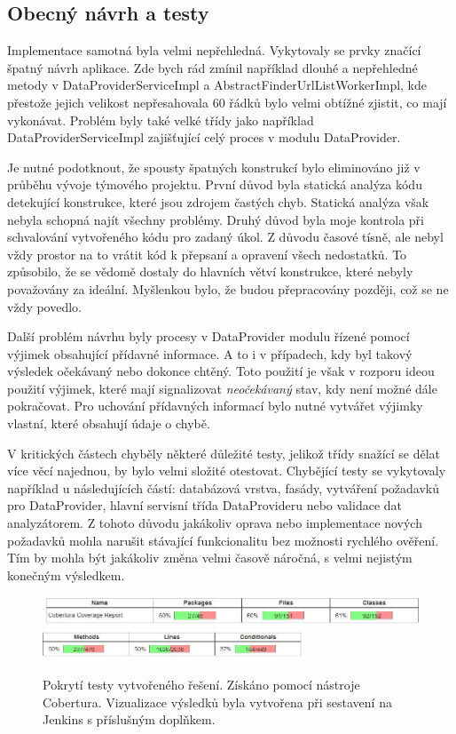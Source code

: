 \documentclass[thesis=B,czech]{FITthesis}[2012/06/26]
\begin{document}
\subsection{Obecný návrh a testy}\label{ch:architecture-tests}
Implementace samotná byla velmi nepřehledná. Vykytovaly se prvky značící špatný návrh aplikace.
Zde bych rád zmínil například dlouhé a nepřehledné metody v
DataProviderServiceImpl a AbstractFinderUrlListWorkerImpl, kde přestože jejich velikost 
nepřesahovala 60 řádků bylo velmi obtížné zjistit, co mají vykonávat. Problém byly také velké třídy
jako například DataProviderServiceImpl zajišťující celý proces v modulu DataProvider.
\par
Je nutné podotknout, že spousty špatných konstrukcí bylo eliminováno již v průběhu vývoje týmového projektu.
První důvod byla statická analýza kódu detekující konstrukce, které jsou zdrojem častých chyb. Statická analýza
však nebyla schopná najít všechny problémy. Druhý důvod byla moje kontrola při schvalování vytvořeného kódu pro 
zadaný úkol. Z důvodu časové tísně, ale nebyl vždy prostor na to vrátit kód k přepsaní a opravení všech nedostatků. To způsobilo, že
se vědomě dostaly do hlavních větví konstrukce, které nebyly považovány za ideální. Myšlenkou bylo, že budou přepracovány později, což se ne vždy povedlo.
\par
Další problém návrhu byly procesy v DataProvider modulu řízené pomocí výjimek obsahující 
přídavné informace. A to i v případech, kdy byl takový výsledek očekávaný nebo dokonce chtěný. 
Toto použití je však v rozporu ideou použití výjimek, které mají signalizovat \textit{neočekávaný} stav, kdy není možné dále pokračovat.\cite{exception}
Pro uchování přídavných informací bylo nutné vytvářet výjimky vlastní, které obsahují údaje o chybě.
\par
V kritických částech chyběly některé důležité testy, jelikož třídy snažící se dělat více věcí najednou, by bylo velmi
složité otestovat. Chybějící testy se vykytovaly například u následujících částí: databázová vrstva, fasády, vytváření požadavků pro DataProvider,
hlavní servisní třída DataProvideru nebo validace dat analyzátorem. Z tohoto důvodu jakákoliv oprava nebo implementace nových požadavků 
mohla narušit stávající funkcionalitu bez možnosti rychlého ověření. Tím by mohla být jakákoliv změna velmi časově náročná, s velmi nejistým konečným výsledkem.

\begin{figure}[h]\centering
 	\includegraphics[width=1.0\textwidth]{resources/cobertura-report-old-1}
 	\includegraphics[width=0.7\textwidth]{resources/cobertura-report-old-2}
	\caption[Pokrytí testy vytvořeného řešení]{Pokrytí testy vytvořeného řešení. Získáno pomocí nástroje Cobertura. Vizualizace
	výsledků byla vytvořena při sestavení na Jenkins s příslušným doplňkem.}\label{fig:cober-old}
\end{figure}
\end{document}
